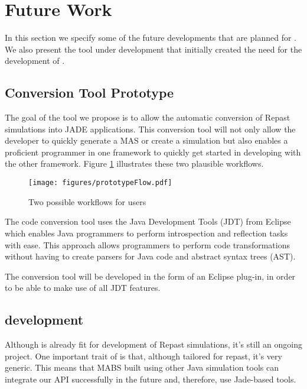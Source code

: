 \section{Future Work}
\label{sec:prototype}

In this section we specify some of the future developments that are planned for \apiname. We also present the tool under development that initially created the need for the development of \apiname.

\subsection{Conversion Tool Prototype}

The goal of the tool we propose is to allow the automatic conversion of Repast simulations into JADE applications. This conversion tool will not only allow the developer to quickly generate a MAS or create a simulation but also enables a proficient programmer in one framework to quickly get started in developing with the other framework. Figure \ref{fig:prototypeFlow} illustrates these two plausible workflows.

\begin{figure}[h]
	\centering
	\texttt{[image: figures/prototypeFlow.pdf]}
	\caption{
		Two possible workflows for \apiname{} users
	}
	\label{fig:prototypeFlow}
\end{figure}

The code conversion tool uses the Java Development Tools (JDT) from Eclipse which enables Java programmers to perform introspection and reflection tasks with ease. This approach allows programmers to perform code transformations without having to create parsers for Java code and abstract syntax trees (AST).

The conversion tool will be developed in the form of an Eclipse plug-in, in order to be able to make use of all JDT features.

\subsection{\apiname{} development}

Although \apiname{} is already fit for development of Repast simulations, it's still an ongoing project. One important trait of \apiname{} is that, although tailored for repast, it's very generic. This means that MABS built using other Java simulation tools can integrate our API successfully in the future and, therefore, use Jade-based tools.
